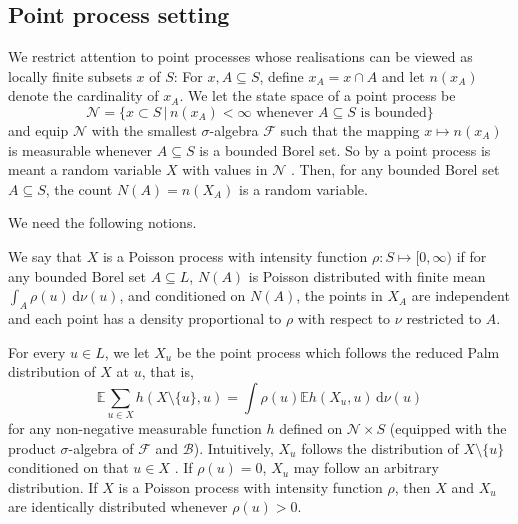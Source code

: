 \documentclass[alpha-refs]{wiley-article}
\begin{document}

\subsection{Point process setting}\label{s:3.1}

 We restrict attention to point processes whose realisations can be viewed as locally finite subsets $x$ of $S$: For  
 $x,A\subseteq S$, define $x_A= x\cap A$ and let $n(x_A)$ denote the cardinality of $x_A$. We let the state space of 
 a point process be $$\mathcal N= \{x\subset S\,|\,n(x_A)<\infty \mbox{ whenever $A\subseteq S$ is bounded}\}$$ 
 and equip  $\mathcal N$ with the smallest $\sigma$-algebra $\mathcal F$ such that the mapping $x\mapsto n(x_A)$ is measurable whenever $A\subseteq S$ is a bounded Borel set. So
 by a point process is meant a random variable $X$ with values in $\mathcal N$ \citep[in the terminology of point process theory, $X$ is a simple locally finite point process, see e.g.][]{DaleyVere-Jones}. Then, for any bounded Borel set $A\subseteq S$, the count $N(A)=n(X_A)$ is a random variable.
 
We need the following notions. %

We say that $X$ is a Poisson process with intensity function $\rho:S\mapsto[0,\infty)$ if for any bounded Borel set $A\subseteq L$, $N(A)$ is Poisson distributed with finite mean $\int_A\rho(u)\,\mathrm d\nu(u)$, and conditioned on $N(A)$, the points in $X_A$  are independent and each point has a density proportional to $\rho$ with respect to $\nu$ restricted to $A$. 

For every $u\in L$, we let $X_u$  be 
the point process which follows the reduced Palm distribution of $X$ at $u$, that is,
 \[\mathbb E\sum_{u\in X}h(X\setminus\{u\},u)=\int\rho(u)\mathbb E h(X_u,u)\,\mathrm d\nu(u)\]
 for any non-negative measurable function $h$ defined on $\mathcal N\times S$ (equipped with the product $\sigma$-algebra of $\mathcal F$ and $\mathcal B$). Intuitively, $X_u$ follows the distribution of $X\setminus\{u\}$ conditioned on that $u\in X$ \citep[see e.g.][Appendix C]{MW04}. If $\rho(u)=0$, 
 $X_u$ may follow an arbitrary distribution. If   
  $X$ is a Poisson process with intensity function $\rho$, then $X$ and $X_u$ are identically distributed whenever 
 $\rho(u)>0$.
 
\end{document}
